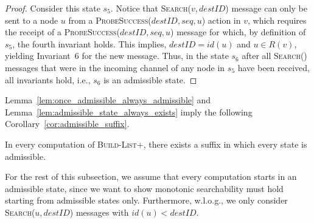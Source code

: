 \documentclass[a4paper,USenglish]{lipics}
\newcommand{\blp}{\textsc{Build-List+}\xspace}
\newcommand{\search}[1]{\textsc{Search(\ensuremath{#1})}\xspace}
\newcommand{\psuccess}[1]{\textsc{ProbeSuccess(\ensuremath{#1})}\xspace}
\begin{document}
\begin{proof}
Consider this state $s_5$.
Notice that \search{v,destID} message can only be sent to a node $u$ from a \psuccess{destID,seq,u} action in $v$, which requires the receipt of a \psuccess{destID,seq,u} message for which, by definition of $s_5$, the fourth invariant holds.
This implies, $destID = id(u)$ and $u \in R(v)$, yielding Invariant~6 for the new message.
Thus, in the state $s_6$ after all \search{} messages that were in the incoming channel of any node in $s_5$ have been received, all invariants hold, i.e., $s_6$ is an admissible state.
\end{proof}


Lemma~\ref{lem:once_admissible_always_admissible} and Lemma~\ref{lem:admissible_state_always_exists} imply the following Corollary~\ref{cor:admissible_suffix}.

\begin{corollary}
\label{cor:admissible_suffix}
    In every computation of \blp, there exists a suffix in which every state is admissible. 
\end{corollary}
For the rest of this subsection, we assume that every computation starts in an admissible state, since we want to show monotonic searchability must hold starting from admissible states only.
Furthermore, w.l.o.g., we only consider \search{u,destID} messages with $id(u) < destID$.
\end{document}
